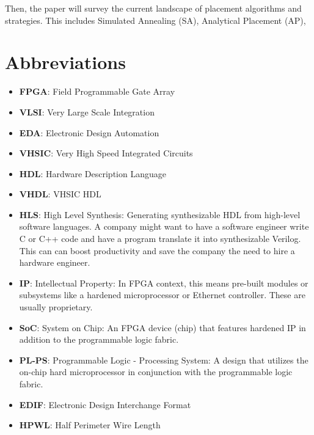 \documentclass{article}
\begin{document}
Then, the paper will survey the current landscape of placement algorithms and strategies. 
This includes Simulated Annealing (SA), Analytical Placement (AP), 


\section{Abbreviations}
\begin{itemize}[label={--}, left=0.25cm]
    \item \textbf{FPGA}: Field Programmable Gate Array
    \item \textbf{VLSI}: Very Large Scale Integration
    \item \textbf{EDA}: Electronic Design Automation
    \item \textbf{VHSIC}: Very High Speed Integrated Circuits
    \item \textbf{HDL}: Hardware Description Language
    \item \textbf{VHDL}: VHSIC HDL
    \item \textbf{HLS}: High Level Synthesis: Generating synthesizable HDL from high-level software languages. A company might want to have a software engineer write C or C++ code and have a program translate it into synthesizable Verilog. This can can boost productivity and save the company the need to hire a hardware engineer.
    \item \textbf{IP}: Intellectual Property: In FPGA context, this means pre-built modules or subsystems like a hardened microprocessor or Ethernet controller. These are usually proprietary.
    \item \textbf{SoC}: System on Chip: An FPGA device (chip) that features hardened IP in addition to the programmable logic fabric.
    \item \textbf{PL-PS}: Programmable Logic - Processing System: A design that utilizes the on-chip hard microprocessor in conjunction with the programmable logic fabric.
    \item \textbf{EDIF}: Electronic Design Interchange Format
    \item \textbf{HPWL}: Half Perimeter Wire Length
\end{itemize}
\end{document}
